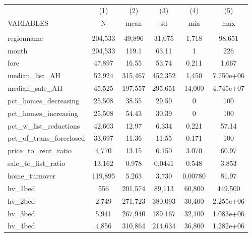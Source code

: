 \documentclass[]{article}
\begin{document}
\begin{center}
\begin{tabular}{lccccc} \hline
 & (1) & (2) & (3) & (4) & (5) \\
VARIABLES & N & mean & sd & min & max \\ \hline
\vspace{4pt} & \begin{footnotesize}\end{footnotesize} & \begin{footnotesize}\end{footnotesize} & \begin{footnotesize}\end{footnotesize} & \begin{footnotesize}\end{footnotesize} & \begin{footnotesize}\end{footnotesize} \\
regionname & 204,533 & 49,896 & 31,075 & 1,718 & 98,651 \\
month & 204,533 & 119.1 & 63.11 & 1 & 226 \\
fore & 47,897 & 16.55 & 53.74 & 0.211 & 1,667 \\
median\_list\_AH & 52,924 & 315,467 & 452,352 & 1,450 & 7.750e+06 \\
median\_sale\_AH & 45,525 & 197,557 & 295,651 & 14,000 & 4.745e+07 \\
pct\_homes\_decreasing & 25,508 & 38.55 & 29.50 & 0 & 100 \\
pct\_homes\_increasing & 25,508 & 54.43 & 30.39 & 0 & 100 \\
pct\_w\_list\_reductions & 42,603 & 12.97 & 6.334 & 0.221 & 57.14 \\
pct\_of\_trans\_foreclosed & 33,697 & 11.36 & 11.55 & 0.171 & 100 \\
price\_to\_rent\_ratio & 4,770 & 13.15 & 6.150 & 3.070 & 60.97 \\
sale\_to\_list\_ratio & 13,162 & 0.978 & 0.0441 & 0.548 & 3.853 \\
home\_turnover & 119,895 & 5.263 & 3.730 & 0.00780 & 81.97 \\
hv\_1bed & 556 & 201,574 & 89,113 & 60,800 & 449,500 \\
hv\_2bed & 2,749 & 271,723 & 380,093 & 30,400 & 2.255e+06 \\
hv\_3bed & 5,941 & 267,940 & 189,167 & 32,100 & 1.083e+06 \\
hv\_4bed & 4,856 & 310,864 & 214,634 & 36,800 & 1.282e+06 \\

\end{tabular}
\end{center}
\end{document}

